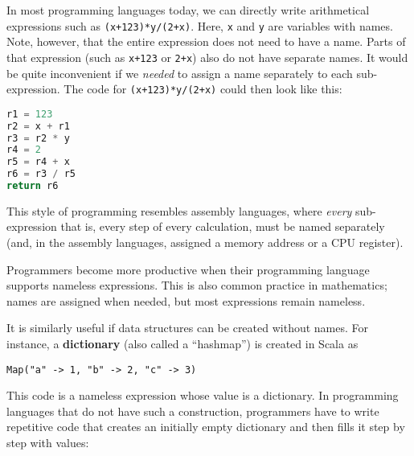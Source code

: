 In most programming languages today, we can directly write arithmetical
expressions such as \texttt{}\lstinline!(x+123)*y/(2+x)!. Here,
\texttt{}\lstinline!x! and \texttt{}\lstinline!y! are variables
with names. Note, however, that the entire expression does not need
to have a name. Parts of that expression (such as \texttt{}\lstinline!x+123!
or \lstinline!2+x!) also do not have separate names. It would be
quite inconvenient if we \emph{needed} to assign a name separately
to each sub-expression. The code for \lstinline!(x+123)*y/(2+x)!
could then look like this:

\begin{lstlisting}[language=Python]
r1 = 123
r2 = x + r1
r3 = r2 * y
r4 = 2
r5 = r4 + x
r6 = r3 / r5
return r6
\end{lstlisting}

This style of programming resembles assembly languages,
where \emph{every} sub-expression \textendash{} that is, every step
of every calculation, \textendash{} must be named separately (and,
in the assembly languages, assigned a memory address or a CPU register).

Programmers become more productive when their programming language
supports nameless expressions. This is also common practice in mathematics;
names are assigned when needed, but most expressions remain nameless.

It is similarly useful if data structures can be created without names.
For instance, a \textbf{dictionary} (also called
a ``hashmap'') is created in Scala as
\begin{lstlisting}
Map("a" -> 1, "b" -> 2, "c" -> 3)
\end{lstlisting}
This code is a nameless expression whose value is a dictionary. In
programming languages that do not have such a construction, programmers
have to write repetitive code that creates an initially empty dictionary
and then fills it step by step with values:

